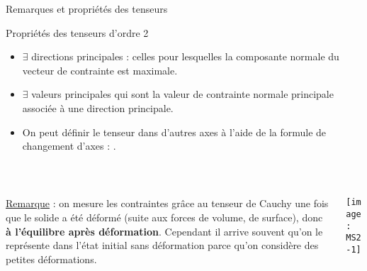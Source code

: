 \documentclass[10pt]{beamer}
\begin{document}
\begin{frame}{Remarques et propriétés des tenseurs}


\begin{block}{Propriétés des tenseurs d'ordre 2}
\begin{itemize}
\item $\exists$ directions principales : celles pour lesquelles la composante normale du vecteur de contrainte est maximale. 
\item $\exists$ valeurs principales qui sont la valeur de contrainte normale principale associée à une direction principale. %
\item On peut définir le tenseur dans d'autres axes à l'aide de la formule de changement d'axes : .
\end{itemize}
\end{block}
\strut \\
\begin{minipage}{\textwidth}
\begin{columns}[T]
\begin{column}{0.7\textwidth}
\small \underline{Remarque} : on mesure les contraintes grâce au tenseur de Cauchy une fois que le solide a été déformé (suite aux forces de volume, de surface), donc \textbf{à l'équilibre après déformation}. Cependant il arrive souvent qu'on le représente dans l'état initial sans déformation parce qu'on considère des petites déformations.
\end{column}
\begin{column}{0.3\textwidth}
\texttt{[image: MS2-1]}
\end{column}
\end{columns}
\end{minipage}

\end{frame}
\end{document}
